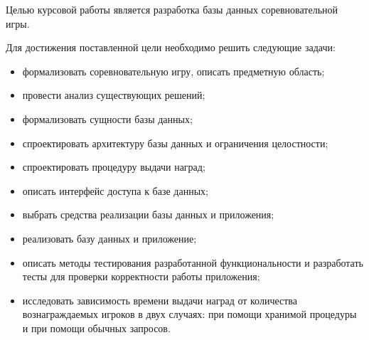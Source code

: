 
Целью курсовой работы является разработка базы данных соревновательной игры.
 
Для достижения поставленной цели необходимо решить следующие задачи:
\begin{itemize}
	\item формализовать соревновательную игру, описать предметную область;
	\item провести анализ существующих решений;
	\item формализовать сущности базы данных;
	\item спроектировать архитектуру базы данных и ограничения целостности;
	\item спроектировать процедуру выдачи наград;
	\item описать интерфейс доступа к базе данных; 
	\item выбрать средства реализации базы данных и приложения;
	\item реализовать базу данных и приложение;
	\item описать методы тестирования разработанной функциональности и разработать тесты для проверки корректности работы приложения;
	\item исследовать зависимость времени выдачи наград от количества вознаграждаемых игроков в двух случаях: при помощи хранимой процедуры и при помощи обычных запросов.
\end{itemize}

\clearpage
